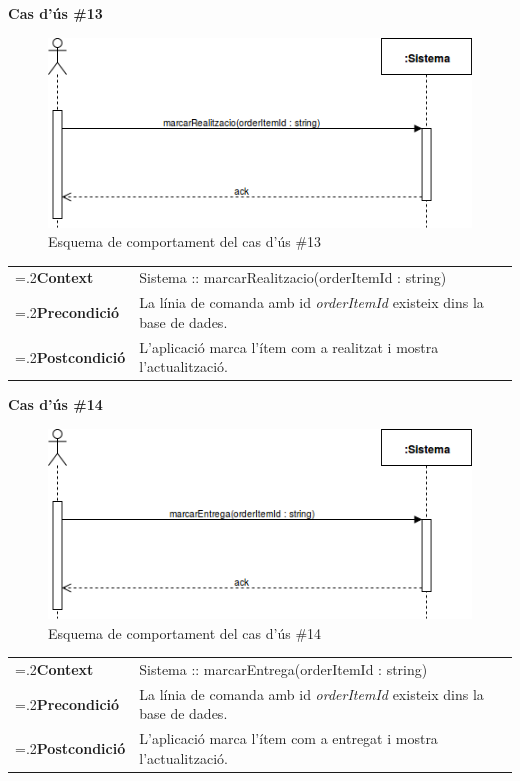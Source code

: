 \clearpage
\noindent\textbf{\large Cas d'ús \#13}\\
\begin{figure}[H]
\centering
\includegraphics[scale=0.6]{Figures/casdus_13.png}
\caption{Esquema de comportament del cas d'ús \#13}
\end{figure}
\begin{table}[h]
\noindent
\begin{tabularx}{\linewidth}{
>{\hsize=.2\hsize}X%
>{\hsize=0.8\hsize}X%
}
\textbf{Context} 		& Sistema :: marcarRealitzacio(orderItemId : string) \\
\textbf{Precondició} 	& La línia de comanda amb id \textit{orderItemId} existeix dins la base de dades. \\
\textbf{Postcondició}	& L'aplicació marca l'ítem com a realitzat i mostra l'actualització. \\
\end{tabularx}
\label{}
\end{table}

\noindent\textbf{\large Cas d'ús \#14}\\
\begin{figure}[H]
\centering
\includegraphics[scale=0.6]{Figures/casdus_14.png}
\caption{Esquema de comportament del cas d'ús \#14}
\end{figure}
\begin{table}[h]
\noindent
\begin{tabularx}{\linewidth}{
>{\hsize=.2\hsize}X%
>{\hsize=0.8\hsize}X%
}
\textbf{Context} 		& Sistema :: marcarEntrega(orderItemId : string) \\
\textbf{Precondició} 	& La línia de comanda amb id \textit{orderItemId} existeix dins la base de dades. \\
\textbf{Postcondició}	& L'aplicació marca l'ítem com a entregat i mostra l'actualització. \\
\end{tabularx}
\label{}
\end{table}


